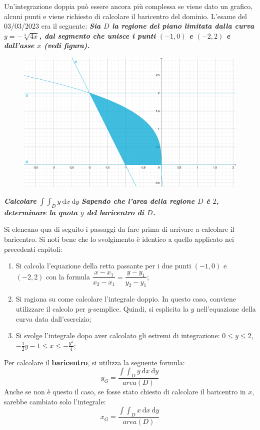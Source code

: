 \documentclass[a4paper]{article}
\begin{document}
	Un'integrazione doppia può essere ancora più complessa se viene dato un grafico, alcuni punti e viene richiesto di calcolare il baricentro del dominio. L'esame del 03/03/2023 era il seguente: \textcolor{Green4}{\textbf{\emph{Sia $D$ la regione del piano limitata dalla curva $y = -\sqrt[3]{4x}$, dal segmento che unisce i punti $\left(-1,0\right)$ e $\left(-2,2\right)$ e dall'asse $x$ (vedi figura).}}}
	\begin{figure}[!htp]
		\centering
		\includegraphics[width=.8\textwidth]{img/grafico-ex6-10.pdf}
	\end{figure}

	\noindent
	\textcolor{Green4}{\textbf{\emph{Calcolare}} $\displaystyle\int\int_{D} y \: \mathrm{d}x \: \mathrm{d}y$}\newline
	\textcolor{Green4}{\textbf{\emph{Sapendo che l'area della regione $D$ è $2$, determinare la quota $y$ del baricentro di $D$.}}}\newline

	\noindent
	Si elencano qua di seguito i passaggi da fare prima di arrivare a calcolare il baricentro. Si noti bene che lo svolgimento è identico a quello applicato nei precedenti capitoli:
	\begin{enumerate}
		\item Si calcola l'equazione della retta passante per i due punti $\left(-1,0\right)$ e $\left(-2,2\right)$ con la formula $\dfrac{x-x_{1}}{x_{2}-x_{1}} = \dfrac{y-y_{1}}{y_{2}-y_{1}}$;

		\item Si ragiona su come calcolare l'integrale doppio. In questo caso, conviene utilizzare il calcolo per $y$-semplice. Quindi, si esplicita la $y$ nell'equazione della curva data dall'esercizio;

		\item Si svolge l'integrale dopo aver calcolato gli estremi di integrazione: $0 \le y \le 2$, $-\frac{1}{2}y-1 \le x \le -\frac{y^{3}}{4}$;
	\end{enumerate}
	Per calcolare il \textbf{baricentro}, si utilizza la seguente formula:
	\begin{equation*}
		y_{G} = \dfrac{\displaystyle\int\int_{D} y \: \mathrm{d}x \: \mathrm{d}y}{area\left(D\right)}
	\end{equation*}
	Anche se non è questo il caso, se fosse stato chiesto di calcolare il baricentro in $x$, sarebbe cambiato solo l'integrale:
	\begin{equation*}
		x_{G} = \dfrac{\displaystyle\int\int_{D} x \: \mathrm{d}x \: \mathrm{d}y}{area\left(D\right)}
	\end{equation*}
\end{document}
